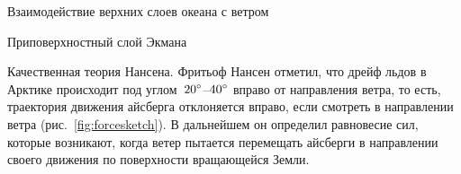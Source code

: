 \begin{chapter}{Взаимодействие верхних слоев океана с ветром}
\begin{section}{Приповерхностный слой Экмана}

\begin{paragraph}{Качественная теория Нансена.}
Фритьоф Нансен отметил, что дрейф льдов в Арктике происходит под 
углом~${20}^\circ$--${40}^\circ$ вправо от направления ветра,
то есть, траектория движения айсберга отклоняется вправо, если смотреть
в направлении ветра (рис.~\ref{fig:forcesketch}). В дальнейшем он определил
равновесие сил, которые возникают, когда ветер пытается перемещать
айсберги в направлении своего движения по поверхности вращающейся Земли.
%


\end{paragraph}
\end{section}
\end{chapter}
